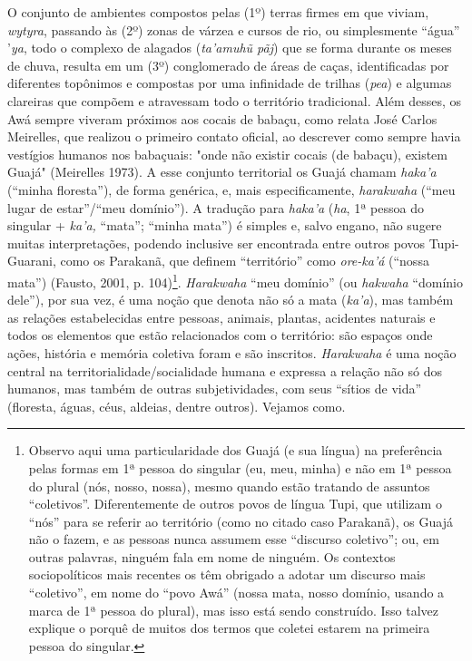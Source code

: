 O conjunto de ambientes compostos pelas (1º) terras firmes em que
viviam, \emph{wytyra}, passando às (2º) zonas de várzea e cursos de rio,
ou simplesmente ``água'' '\emph{ya}, todo o complexo de alagados
(\emph{ta'amuhũ pãj}) que se forma durante os meses de chuva, resulta em
um (3º) conglomerado de áreas de caças, identificadas por diferentes
topônimos e compostas por uma infinidade de trilhas (\emph{pea}) e
algumas clareiras que compõem e atravessam todo o território
tradicional. Além desses, os Awá sempre viveram próximos aos cocais de
babaçu, como relata José Carlos Meirelles, que realizou o primeiro
contato oficial, ao descrever como sempre havia vestígios humanos nos
babaçuais: "onde não existir cocais (de babaçu), existem Guajá"
(Meirelles 1973). A esse conjunto territorial os Guajá chamam
\emph{haka'a} (``minha floresta''), de forma genérica, e, mais
especificamente, \emph{harakwaha} (``meu lugar de estar''/``meu
domínio''). A tradução para \emph{haka'a} (\emph{ha}, 1ª pessoa do
singular + \emph{ka'a,} ``mata''; ``minha mata'') é simples e, salvo
engano, não sugere muitas interpretações, podendo inclusive ser
encontrada entre outros povos Tupi-Guarani, como os Parakanã, que
definem ``território'' como \emph{ore-ka'á} (``nossa mata'') (Fausto,
2001, p. 104)\footnote{Observo aqui uma particularidade dos Guajá (e sua
  língua) na preferência pelas formas em 1ª pessoa do singular (eu, meu,
  minha) e não em 1ª pessoa do plural (nós, nosso, nossa), mesmo quando
  estão tratando de assuntos ``coletivos''. Diferentemente de outros
  povos de língua Tupi, que utilizam o ``nós'' para se referir ao
  território (como no citado caso Parakanã), os Guajá não o fazem, e as
  pessoas nunca assumem esse ``discurso coletivo''; ou, em outras
  palavras, ninguém fala em nome de ninguém. Os contextos sociopolíticos
  mais recentes os têm obrigado a adotar um discurso mais ``coletivo'',
  em nome do ``povo Awá'' (nossa mata, nosso domínio, usando a marca de
  1ª pessoa do plural), mas isso está sendo construído. Isso talvez
  explique o porquê de muitos dos termos que coletei estarem na primeira
  pessoa do singular.}. \emph{Harakwaha} ``meu domínio'' (ou
\emph{hakwaha} ``domínio dele''), por sua vez, é uma noção que denota
não só a mata (\emph{ka'a}), mas também as relações estabelecidas entre
pessoas, animais, plantas, acidentes naturais e todos os elementos que
estão relacionados com o território: são espaços onde ações, história e
memória coletiva foram e são inscritos. \emph{Harakwaha} é uma noção
central na territorialidade/socialidade humana e expressa a relação não
só dos humanos, mas também de outras subjetividades, com seus ``sítios
de vida'' (floresta, águas, céus, aldeias, dentre outros). Vejamos como.

